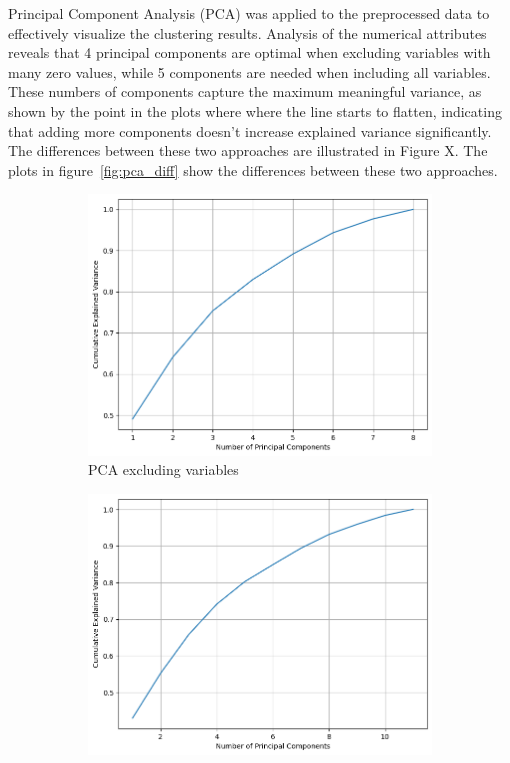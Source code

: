 Principal Component Analysis (PCA) was applied to the preprocessed data to effectively visualize the clustering results. 
Analysis of the numerical attributes reveals that 4 principal components are optimal when excluding variables with many zero values, while 5 components are needed when including all variables. 
These numbers of components capture the maximum meaningful variance, as shown by the point in the plots where where the line starts to flatten, indicating that adding more components doesn't increase explained variance significantly. 
The differences between these two approaches are illustrated in Figure X.
The plots in figure~\ref{fig:pca_diff} show the differences between these two approaches.
\begin{figure}[h]
    \centering
    \begin{subfigure}[b]{0.49\textwidth}
        \centering
        \includegraphics[width=\textwidth]{plots/pca_kmeans.png}
        \caption{PCA excluding variables}
        \label{fig:sse_silh_kmeans}
    \end{subfigure}
    \begin{subfigure}[b]{0.49\textwidth}
        \centering
        \includegraphics[width=\textwidth]{plots/pca5.png}

\end{subfigure}
\end{figure}
